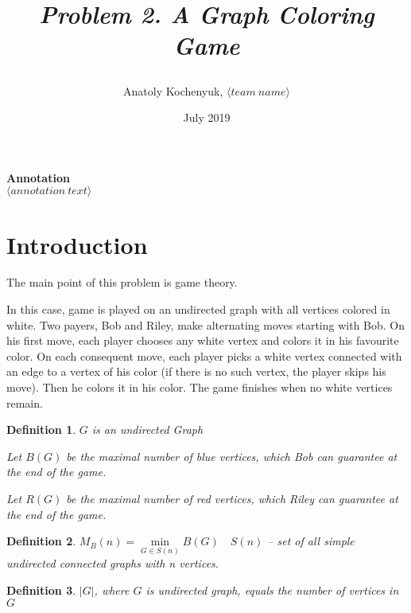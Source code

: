 \documentclass[12pt,a4paper, flushleft]{article}
\author{Anatoly Kochenyuk, $\langle team~name\rangle$}
\date{July 2019}
\title{
	\vspace{4cm}	
	\horline{440}	
	\begin{center}
		\begin{Huge}
			\textbf{\emph{Problem 2. A Graph Coloring Game}}
		\end{Huge}
	\end{center}	
	\vspace{-1.3cm}	
	\horline{460}
}
\newtheorem{Def}{Definition}[section]
\newcommand{\lr}[1]{\langle #1 \rangle}
\begin{document}
\maketitle
\vspace{4cm}
	
	\begin{myquote}
	\begin{center}
		\textbf{Annotation}\\
		\textit{
			$\lr{annotation~text}$
		}
	\end{center}
	\end{myquote}	
	
	\pagebreak

	\tableofcontents	
	
	\pagebreak
	
\section*{Introduction}
The main point of this problem is game theory.

In this case, game is played on an undirected graph with all vertices colored in white. Two payers, Bob and Riley, make alternating moves starting with Bob. On his first move, each player chooses
any white vertex and colors it in his favourite color. On each consequent move, each player picks
a white vertex connected with an edge to a vertex of his color (if there is no such vertex, the
player skips his move). Then he colors it in his color. The game finishes when no white vertices
remain.

\begin{Def}
	$G$ is an undirected Graph

	Let $B(G)$ be the maximal number of blue vertices, which Bob can guarantee at the end of
the game.

	Let $R(G)$ be the maximal number of red vertices, which Riley can guarantee at the
end of the game.
\end{Def}

\begin{Def}
	$M_B(n) = \min\limits_{G\in S(n)}B(G)\quad S(n)$ -- set of all simple undirected connected graphs with n vertices.
\end{Def}

\begin{Def}
	$|G|$, where $G$ is undirected graph, equals the number of vertices in $G$
\end{Def}
\end{document}
